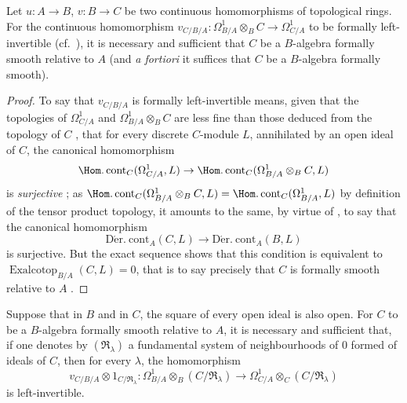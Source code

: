 \begin{proposition}[20.7.2]
\label{0.20.7.2}
Let $u:A\to B$, $v:B\to C$ be two continuous homomorphisms of topological rings.
For the continuous homomorphism $v_{C/B/A}:\Omega^1_{B/A}\otimes_B C\to\Omega^1_{C/A}$ to be formally left-invertible \textup{(}cf.\ \textup{)}, it is necessary and sufficient that $C$ be a $B$-algebra formally smooth relative to $A$  \textup{(}and \emph{a fortiori} it suffices that $C$ be a $B$-algebra formally smooth\textup{)}.
\end{proposition}

\begin{proof}
To say that $v_{C/B/A}$ is formally left-invertible means, given that the topologies of $\Omega^1_{C/A}$ and $\Omega^1_{B/A}\otimes_B C$ are less fine than those deduced from the topology of $C$ , that for every discrete $C$-module $L$, annihilated by an open ideal of $C$, the canonical homomorphism
\[
  \Hom.\operatorname{cont}_C(\Omega^1_{C/A},L)\to\Hom.\operatorname{cont}_C(\Omega^1_{B/A}\otimes_B C,L)
\]
is \emph{surjective} ; as $\Hom.\operatorname{cont}_C(\Omega^1_{B/A}\otimes_B C,L)=\Hom.\operatorname{cont}_C(\Omega^1_{B/A},L)$ by definition of the tensor product topology, it amounts to the same, by virtue of , to say that the canonical homomorphism
\[
  \operatorname{D\acute{e}r.\ cont}_A(C,L)\to\operatorname{D\acute{e}r.\ cont}_A(B,L)
\]
is surjective.
But the exact sequence  shows that this condition is equivalent to $\operatorname{Exalcotop}_{B/A}(C,L)=0$, that is to say precisely that $C$ is formally smooth relative to $A$ .
\end{proof}

\begin{corollary}[20.7.3]
\label{0.20.7.3}
Suppose that in $B$ and in $C$, the square of every open ideal is also open.
For $C$ to be a $B$-algebra formally smooth relative to $A$, it is necessary and sufficient that, if one denotes by $(\mathfrak{R}_\lambda)$ a fundamental system of neighbourhoods of $0$ formed of ideals of $C$, then for every $\lambda$, the homomorphism
\begin{equation}
\tag{20.7.3.1}
  \label{0.20.7.3.1}
  v_{C/B/A}\otimes 1_{C/\mathfrak{R}_\lambda}:\Omega^1_{B/A}\otimes_B(C/\mathfrak{R}_\lambda)\to\Omega^1_{C/A}\otimes_C(C/\mathfrak{R}_\lambda)
\end{equation}
is left-invertible.
\end{corollary}

